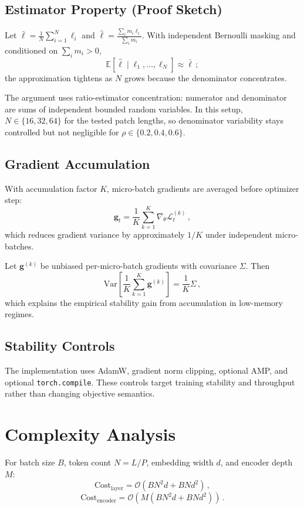 \documentclass[journal]{IEEEtran}
\begin{document}
\subsection{Estimator Property (Proof Sketch)}
Let $\bar{\ell}=\frac{1}{N}\sum_{i=1}^{N}\ell_i$ and $\hat{\ell}=\frac{\sum_i m_i\ell_i}{\sum_i m_i}$. With independent Bernoulli masking and conditioned on $\sum_i m_i > 0$,
\begin{equation}
\mathbb{E}[\hat{\ell}\mid \ell_1,\ldots,\ell_N] \approx \bar{\ell}\,;
\label{eq:consistency}
\end{equation}
the approximation tightens as $N$ grows because the denominator concentrates.

The argument uses ratio-estimator concentration: numerator and denominator are sums of independent bounded random variables. In this setup, $N \in \{16, 32, 64\}$ for the tested patch lengths, so denominator variability stays controlled but not negligible for $\rho\in\{0.2,0.4,0.6\}$.

\subsection{Gradient Accumulation}
With accumulation factor $K$, micro-batch gradients are averaged before optimizer step:
\begin{equation}
\mathbf{g}_t = \frac{1}{K}\sum_{k=1}^{K} \nabla_\theta \mathcal{L}^{(k)}_t\,,
\label{eq:gradacc}
\end{equation}
which reduces gradient variance by approximately $1/K$ under independent micro-batches.

Let $\mathbf{g}^{(k)}$ be unbiased per-micro-batch gradients with covariance $\Sigma$. Then
\begin{equation}
\mathrm{Var}\!\left[\frac{1}{K}\sum_{k=1}^{K}\mathbf{g}^{(k)}\right] = \frac{1}{K}\Sigma\,,
\label{eq:gradvar}
\end{equation}
which explains the empirical stability gain from accumulation in low-memory regimes.

\subsection{Stability Controls}
The implementation uses AdamW, gradient norm clipping, optional AMP, and optional \texttt{torch.compile}. These controls target training stability and throughput rather than changing objective semantics.

\section{Complexity Analysis}
For batch size $B$, token count $N=L/P$, embedding width $d$, and encoder depth $M$:
\begin{equation}
\text{Cost}_{\text{layer}} = \mathcal{O}(B N^2 d + B N d^2)\,,
\label{eq:layercost}
\end{equation}
\begin{equation}
\text{Cost}_{\text{encoder}} = \mathcal{O}\left(M(B N^2 d + B N d^2)\right)\,.
\label{eq:encodercost}
\end{equation}
\end{document}
